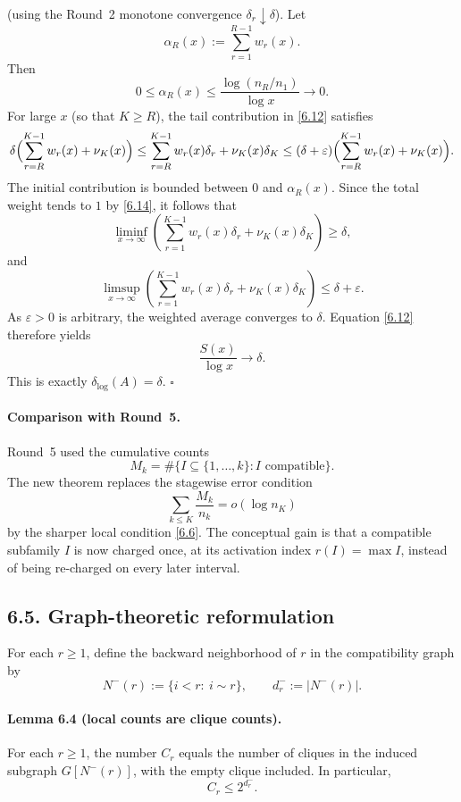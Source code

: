 (using the Round~2 monotone convergence $\delta_r\downarrow\delta$).  Let
\[
\alpha_R(x):=\sum_{r=1}^{R-1}w_r(x).
\]
Then
\[
0\le \alpha_R(x)\le \frac{\log(n_R/n_1)}{\log x}\to 0.
\]
For large $x$ (so that $K\ge R$), the tail contribution in \eqref{6.12} satisfies
\[
\delta\Bigl(\sum_{r=R}^{K-1}w_r(x)+\nu_K(x)\Bigr)
\le
\sum_{r=R}^{K-1}w_r(x)\delta_r+\nu_K(x)\delta_K
\le
(\delta+\varepsilon)\Bigl(\sum_{r=R}^{K-1}w_r(x)+\nu_K(x)\Bigr).
\]
The initial contribution is bounded between $0$ and $\alpha_R(x)$.  Since the total weight tends to $1$ by \eqref{6.14}, it follows that
\[
\liminf_{x\to\infty}\left(\sum_{r=1}^{K-1}w_r(x)\delta_r+\nu_K(x)\delta_K\right)\ge \delta,
\]
and
\[
\limsup_{x\to\infty}\left(\sum_{r=1}^{K-1}w_r(x)\delta_r+\nu_K(x)\delta_K\right)\le \delta+\varepsilon.
\]
As $\varepsilon>0$ is arbitrary, the weighted average converges to $\delta$.  Equation \eqref{6.12} therefore yields
\[
\frac{S(x)}{\log x}\longrightarrow \delta.
\]
This is exactly $\delta_{\log}(A)=\delta$.  \hfill $\square$

\paragraph{Comparison with Round~5.}
Round~5 used the cumulative counts
\[
M_k=\#\{I\subseteq\{1,\dots,k\}: I\text{ compatible}\}.
\]
The new theorem replaces the stagewise error condition
\[
\sum_{k\le K}\frac{M_k}{n_k}=o(\log n_K)
\]
by the sharper local condition \eqref{6.6}.  The conceptual gain is that a compatible subfamily $I$ is now charged once, at its activation index $r(I)=\max I$, instead of being re-charged on every later interval.

\subsection*{6.5. Graph-theoretic reformulation}
For each $r\ge 1$, define the backward neighborhood of $r$ in the compatibility graph by
\[
N^{-}(r):=\{i<r:\ i\sim r\},
\qquad
d_r^{-}:=|N^{-}(r)|.
\]

\paragraph{Lemma 6.4 (local counts are clique counts).}
For each $r\ge 1$, the number $C_r$ equals the number of cliques in the induced subgraph $G[N^{-}(r)]$, with the empty clique included.  In particular,
\begin{equation}
C_r\le 2^{d_r^{-}}.
\tag{6.15}
\end{equation}

